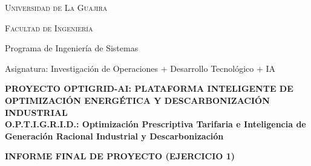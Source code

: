 \documentclass[11pt,a4paper]{article}
\begin{document}
\begin{titlepage}
    \centering
    \vspace*{0.5cm}
    {\scshape\Large Universidad de La Guajira \par}
    \vspace{0.3cm}
    {\scshape\large Facultad de Ingeniería \par}
    \vspace{0.2cm}
    {\large Programa de Ingeniería de Sistemas \par}
    \vspace{0.2cm}
    {\large Asignatura: Investigación de Operaciones + Desarrollo Tecnológico + IA \par}
    \vspace{1.2cm}
    
    \begin{tcolorbox}[colback=lightgray, colframe=primary, arc=4mm, boxrule=1.5pt, width=0.98\textwidth]
        \centering
        \vspace{0.3cm}
        {\LARGE \textbf{\color{primary}PROYECTO OPTIGRID-AI: PLATAFORMA INTELIGENTE DE OPTIMIZACIÓN ENERGÉTICA Y DESCARBONIZACIÓN INDUSTRIAL}} \\[0.4cm]
        {\large \textbf{\color{secondary}O.P.T.I.G.R.I.D.: Optimización Prescriptiva Tarifaria e Inteligencia de Generación Racional Industrial y Descarbonización}}
        \vspace{0.3cm}
    \end{tcolorbox}
    
    \vspace{1.5cm}
    \textbf{\LARGE INFORME FINAL DE PROYECTO (EJERCICIO 1)}
    
    \vspace{1.4cm}
    

\end{titlepage}
\end{document}
